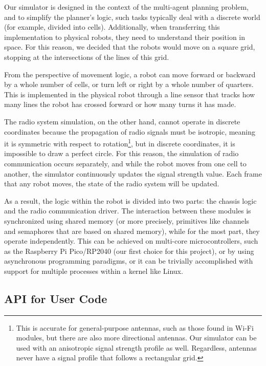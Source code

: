 \documentclass[%
]{article}
\begin{document}
Our simulator is designed in the context of the multi-agent planning problem,
and to simplify the planner's logic, such tasks typically deal with a discrete world (for example, divided into cells).
Additionally, when transferring this implementation to physical robots, they need to understand their position in space.
For this reason, we decided that the robots would move on a square grid, stopping at the intersections of the lines of this grid.

From the perspective of movement logic,
a robot can move forward or backward by a whole number of cells,
or turn left or right by a whole number of quarters.
This is implemented in the physical robot through a line sensor that tracks how many lines the robot has crossed forward or how many turns it has made.

The radio system simulation, on the other hand, cannot operate in discrete coordinates
because the propagation of radio signals must be isotropic,
meaning it is symmetric with respect to rotation\footnote{This is accurate for general-purpose antennas,
such as those found in Wi-Fi modules,
but there are also more directional antennas.
Our simulator can be used with an anisotropic signal strength profile as well.
Regardless, antennas never have a signal profile that follows a rectangular grid.},
but in discrete coordinates, it is impossible to draw a perfect circle.
For this reason, the simulation of radio communication occurs separately,
and while the robot moves from one cell to another,
the simulator continuously updates the signal strength value.
Each frame that any robot moves, the state of the radio system will be updated.

As a result, the logic within the robot is divided into two parts:
the chassis logic and the radio communication driver.
The interaction between these modules is synchronized using shared memory
(or more precisely, primitives like channels and semaphores that are based on shared memory),
while for the most part, they operate independently.
This can be achieved on multi-core microcontrollers, such as the Raspberry Pi Pico/RP2040 (our first choice for this project),
or by using asynchronous programming paradigms,
or it can be trivially accomplished with support for multiple processes within a kernel like Linux.

\subsection{API for User Code}
\end{document}
